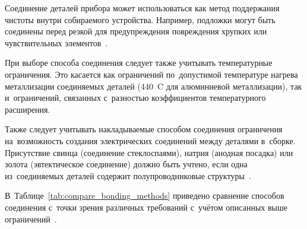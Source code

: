 Соединение деталей прибора может использоваться как метод поддержания чистоты внутри собираемого устройства. Например, подложки могут быть соединены перед резкой для предупреждения повреждения хрупких или чувствительных элементов~\cite{lit_Esashi_Wafer2008}.

При выборе способа соединения следует также учитывать температурные ограничения. Это касается как ограничений по~допустимой температуре нагрева металлизации соединяемых деталей (440~{\textdegree}C для алюминиевой металлизации), так и~ограничений, связанных с~разностью коэффициентов температурного расширения.

Также следует учитывать накладываемые способом соединения ограничения
на~возможность создания электрических соединений между деталями
в~сборке. Присутствие свинца (соединение стеклоспаями), натрия
(анодная посадка) или золота (эвтектическое соединение) должно быть
учтено, если одна из~соединяемых деталей содержит полупроводниковые
структуры~\cite{Dragoi_cmos_wafer_bonding}.

В~Таблице~\ref{tab:compare_bonding_methods} приведено сравнение способов соединения с~точки зрения различных требований с~учётом описанных выше ограничений~\cite{New_low_temperature_bonding_tech,Dragoi_cmos_wafer_bonding,Babaevskij_korpusirovanie_NMST2014_3}.

